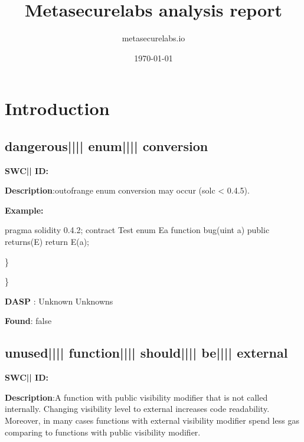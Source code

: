 \documentclass{article}
\title{Metasecurelabs analysis report}
\author{metasecurelabs.io }
\date{\today}
\begin{document}
 

\maketitle 

\section{Introduction} 
\subsection{dangerous{||\textunderscore|| }enum{||\textunderscore|| }conversion} 
\textbf{SWC{|\textunderscore| }ID:} 

\textbf{Description}:out{\textendash}of{\textendash}range enum conversion may occur (solc < 0.4.5).


\textbf{Example:} 
\begin{ffcode} 

pragma solidity 0.4.2;
contract Test{
  enum E{a}
  function bug(uint a) public returns(E){
        return E(a);
    }
}

\end{ffcode} 
\} 

\} 

\textbf{DASP} : Unknown Unknowns

\textbf{Found}: false

\subsection{unused{||\textunderscore|| }function{||\textunderscore|| }should{||\textunderscore|| }be{||\textunderscore|| }external} 
\textbf{SWC{|\textunderscore| }ID:} 

\textbf{Description}:A function with public visibility modifier that is not called internally. Changing visibility level to external increases code readability. Moreover, in many cases functions with external visibility modifier spend less gas comparing to functions with public visibility modifier.
\end{document}
